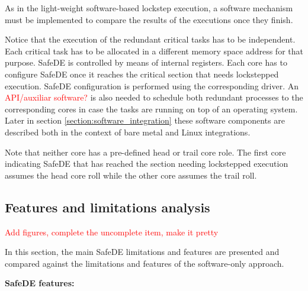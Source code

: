 As in the light-weight software-based lockstep execution, a software mechanism must be implemented to compare the results of the executions once they finish. 

Notice that the execution of the redundant critical tasks has to be independent. Each critical task has to be allocated in a different memory space address for that purpose. SafeDE is controlled by means of internal registers. Each core has to configure SafeDE once it reaches the critical section that needs lockstepped execution. SafeDE configuration is performed using the corresponding driver. An \textcolor{red}{API/auxiliar software?} is also needed to schedule both redundant processes to the corresponding cores in case the tasks are running on top of an operating system. Later in section \ref{section:software_integration} these software components are described both in the context of bare metal and Linux integrations.

Note that neither core has a pre-defined head or trail core role. The first core indicating SafeDE that has reached the section needing lockstepped execution assumes the head core roll while the other core assumes the trail roll.


\subsection{Features and limitations analysis}
\textcolor{red}{Add figures, complete the uncomplete item, make it pretty}

In this section, the main SafeDE limitations and features are presented and compared against the limitations and features of the software-only approach.

\textbf{SafeDE features:}

